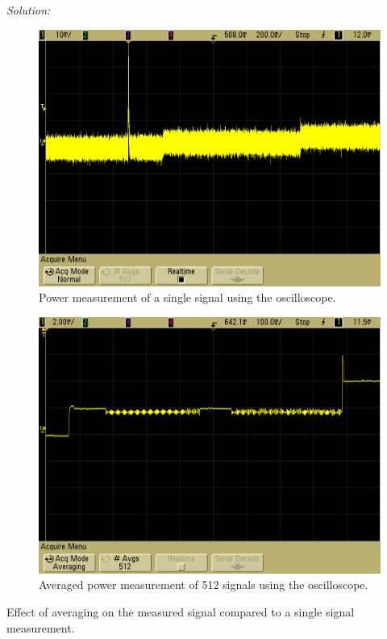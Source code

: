 \documentclass[a4paper,11pt]{article}
\newenvironment{solution}%
{\par{\noindent\small\textit{Solution:}}\vspace{-12pt}\begin{framed}}%
{\end{framed}\par}
\begin{document}
\begin{enumerate}[(a)]
\begin{solution}
\begin{center}
\begin{subfigure}[b]{0.47\textwidth}
	\includegraphics[width=\textwidth]{screenshots/print_000.png}
	\caption{Power measurement of a single signal using the oscilloscope.}
	\label{fig:single_signal}
\end{subfigure}
\begin{subfigure}[b]{0.47\textwidth}
	\includegraphics[width=\textwidth]{screenshots/print_002.png}
	\caption{Averaged power measurement of 512 signals using the oscilloscope.}
	\label{fig:averaged_signal}
\end{subfigure}

\caption{Effect of averaging on the measured signal compared to a single signal measurement.}
\label{fig:averaging}


\end{center}
\end{solution}
\end{enumerate}
\end{document}

